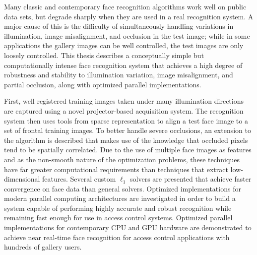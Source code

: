 Many classic and contemporary face recognition algorithms work well on public
data sets, but degrade sharply when they are used in a real recognition system.
A major cause of this is the difficulty of simultaneously handling variations
in illumination, image misalignment, and occlusion in the test image; while in
some applications the gallery images can be well controlled, the test images
are only loosely controlled.  This thesis describes a conceptually simple but
computationally intense face recognition system that achieves a high degree of
robustness and stability to illumination variation, image misalignment, and
partial occlusion, along with optimized parallel implementations.

First, well registered training images taken under many illumination directions
are captured using a novel projector-based acquisition system.  The recognition
system then uses tools from sparse representation to align a test face image to
a set of frontal training images.  To better handle severe occlusions, an
extension to the algorithm is described that makes use of the knowledge that
occluded pixels tend to be spatially correlated.  Due to the use of multiple
face images as features and as the non-smooth nature of the optimization
problems, these techniques have far greater computational requirements than
techniques that extract low-dimensional features.  Several custom $\ell_1$
solvers are presented that achieve faster convergence on face data than general
solvers.  Optimized implementations for modern parallel computing architectures
are investigated in order to build a system capable of performing highly
accurate and robust recognition while remaining fast enough for use in access
control systems.  Optimized parallel implementations for contemporary CPU and
GPU hardware are demonstrated to achieve near real-time face recognition for
access control applications with hundreds of gallery users.



